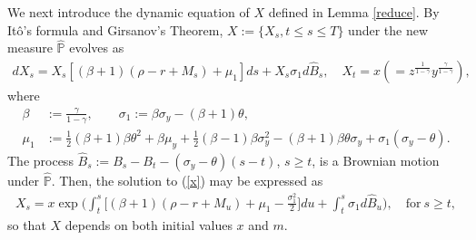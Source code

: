 \documentclass[a4paper,11pt]{amsart}
\numberwithin{equation}{section}
\newcommand{\blue}[1]{{\color{black}#1}}
\begin{document}
We next introduce the dynamic equation of $X$ defined in Lemma \ref{reduce}. By It\^o's formula and Girsanov's Theorem, $X:=\{X_s, t \leq s \leq T\}$ under the new measure $\widehat{\mathbb{P}}$ evolves as  
\begin{align}\label{x}
d X_s =X_s[(\beta+1)(\rho-r+M_s)+\mu_1]ds + X_s \sigma_1 d\widehat{B}_s, \quad X_t=x(=z^{\frac{1}{1-\gamma}}y^{\frac{\gamma}{1-\gamma}}),
\end{align}
where
\begin{align*}
\beta&:=\frac{\gamma}{1-\gamma},\qquad \sigma_1:=\beta\sigma_y-(\beta+1)\theta,\\
\mu_1&:=\frac{1}{2}(\beta+1)\beta\theta^2+\beta\mu_y+\frac{1}{2}(\beta-1)\beta\sigma_y^2-(\beta+1)\beta\theta\sigma_y+\sigma_1(\sigma_y-\theta).\tag{\theequation}\label{Xcoefficients}
\end{align*}
The process \blue{$\widehat B_s:=B_s-B_t-(\sigma_y-\theta)(s-t)$, $s\geq t$, is a Brownian motion under $\widehat{\mathbb P}$.} Then, the solution to (\ref{x}) may be expressed as
\begin{align}\label{xdetailed}
X_s = x \exp \bigg( \int^s_t \Big[(\beta+1)(\rho-r+M_u)+\mu_1-\frac{\sigma_1^2}{2}\Big]du + \int^s_t\sigma_1d \widehat{B}_u  \bigg), \quad \text{for} \ s\geq t,
\end{align}
so that $X$ depends on both initial values $x$ and $m$.
\end{document}
